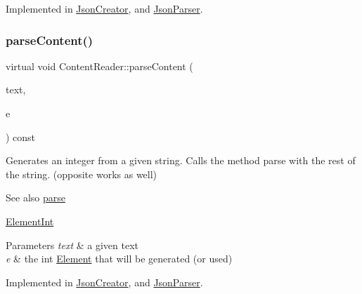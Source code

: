 Implemented in \mbox{\hyperlink{classJsonCreator_a505ff309c6b144d29478804b0e187c6f}{Json\+Creator}}, and \mbox{\hyperlink{classJsonParser_a3ec3a9fcc8a63f987b4749d60b0568df}{Json\+Parser}}.

\mbox{\label{classContentReader_a7eef37b8b9761e21c0a3907ff94c72f7}} 
\subsubsection{\texorpdfstring{parse\+Content()}{parseContent()}\hspace{0.1cm}{\footnotesize\ttfamily [1/6]}}
{\footnotesize\ttfamily virtual void Content\+Reader\+::parse\+Content (\begin{DoxyParamCaption}\item[{std\+::string \&}]{text,  }\item[{\mbox{\hyperlink{classElementInt}{Element\+Int}} $\ast$}]{e }\end{DoxyParamCaption}) const\hspace{0.3cm}{\ttfamily [pure virtual]}}

Generates an integer from a given string. Calls the method parse with the rest of the string. (opposite works as well) \begin{DoxySeeAlso}{See also}
\mbox{\hyperlink{classContentReader_a7fff2e63a2e8fa216665604f69974e1d}{parse}} 

\mbox{\hyperlink{classElementInt}{Element\+Int}}
\end{DoxySeeAlso}

\begin{DoxyParams}{Parameters}
{\em text} & a given text \\
\hline
{\em e} & the int \mbox{\hyperlink{classElement}{Element}} that will be generated (or used) \\
\hline
\end{DoxyParams}


Implemented in \mbox{\hyperlink{classJsonCreator_a0fe34794ee3563c3e0bc35006129fcdc}{Json\+Creator}}, and \mbox{\hyperlink{classJsonParser_ac80cf84ff2565f4c1f3a0f5ddb559c96}{Json\+Parser}}.

\mbox{\label{classContentReader_a310678ddc37a05aca2f13db73b22abe5}} 
